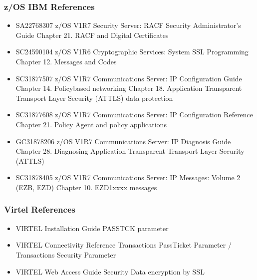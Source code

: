 \documentclass[letterpaper,10pt,english]{sphinxmanual}
\begin{document}
\subsubsection{z/OS IBM References}
\label{\detokenize{Customization:z-os-ibm-references}}\begin{itemize}
\item {} 
\sphinxAtStartPar
SA22\sphinxhyphen{}7683\sphinxhyphen{}07 z/OS V1R7 Security Server: RACF Security Administrator’s Guide Chapter 21. RACF and Digital Certificates

\item {} 
\sphinxAtStartPar
SC24\sphinxhyphen{}5901\sphinxhyphen{}04 z/OS V1R6 Cryptographic Services: System SSL Programming Chapter 12. Messages and Codes

\item {} 
\sphinxAtStartPar
SC31\sphinxhyphen{}8775\sphinxhyphen{}07 z/OS V1R7 Communications Server: IP Configuration Guide Chapter 14. Policy\sphinxhyphen{}based networking Chapter 18. Application Transparent Transport Layer Security (AT\sphinxhyphen{}TLS) data protection

\item {} 
\sphinxAtStartPar
SC31\sphinxhyphen{}8776\sphinxhyphen{}08 z/OS V1R7 Communications Server: IP Configuration Reference Chapter 21. Policy Agent and policy applications

\item {} 
\sphinxAtStartPar
GC31\sphinxhyphen{}8782\sphinxhyphen{}06 z/OS V1R7 Communications Server: IP Diagnosis Guide Chapter 28. Diagnosing Application Transparent Transport Layer Security (AT\sphinxhyphen{}TLS)

\item {} 
\sphinxAtStartPar
SC31\sphinxhyphen{}8784\sphinxhyphen{}05 z/OS V1R7 Communications Server: IP Messages: Volume 2 (EZB, EZD) Chapter 10. EZD1xxxx messages

\end{itemize}


\subsubsection{Virtel References}
\label{\detokenize{Customization:virtel-references}}\begin{itemize}
\item {} 
\sphinxAtStartPar
VIRTEL Installation Guide PASSTCK parameter

\item {} 
\sphinxAtStartPar
VIRTEL Connectivity Reference Transactions \textendash{} PassTicket Parameter / Transactions \textendash{} Security Parameter

\item {} 
\sphinxAtStartPar
VIRTEL Web Access Guide Security \textendash{} Data encryption by SSL

\end{itemize}
\end{document}

